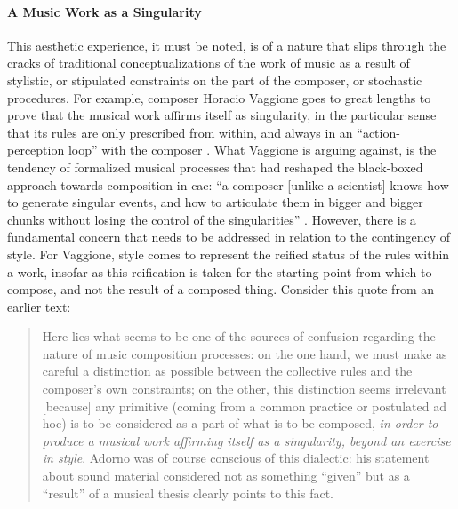 \paragraph{A Music Work as a Singularity}
This aesthetic experience, it must be noted, is of a nature that slips through the cracks of traditional conceptualizations of the work of music as a result of stylistic, or stipulated constraints on the part of the composer, or stochastic procedures. For example, composer Horacio Vaggione goes to great lengths to prove that the musical work affirms itself as singularity, in the particular sense that its rules are only prescribed from within, and always in an ``action-perception loop'' with the composer \parencite{Vag01:Som}. What Vaggione is arguing against, is the tendency of formalized musical processes that had reshaped the black-boxed approach towards composition in \gls{cac}: ``a composer [unlike a scientist] knows how to generate singular events, and how to articulate them in bigger and bigger chunks without losing the control of the singularities'' \parencite[97]{Vag93:Det}. However, there is a fundamental concern that needs to be addressed in relation to the contingency of style. For Vaggione, style comes to represent the reified status of the rules within a work, insofar as this reification is taken for the starting point from which to compose, and not the result of a composed thing. Consider this quote from an earlier text:

\begin{quote}
	Here lies what seems to be one of the sources of confusion regarding the nature of music composition processes: on the one hand, we must make as careful a distinction as possible between the collective rules and the composer's own constraints; on the other, this distinction seems irrelevant [because] any primitive (coming from a common practice or postulated ad hoc) is to be considered as a part of what is to be composed, \textit{in order to produce a musical work affirming itself as a singularity, beyond an exercise in style}. Adorno was of course conscious of this dialectic: his statement about sound material considered not as something ``given'' but as a ``result'' of a musical thesis clearly points to this fact. \im \parencite[59]{Vag01:Som}
\end{quote}

